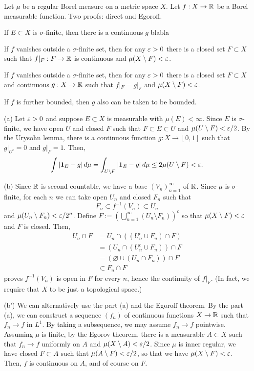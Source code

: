 \documentclass{../../large}
\begin{document}
\begin{prb}
Let $\mu$ be a regular Borel measure on a metric space $X$.
Let $f:X\to\mathbb{R}$ be a Borel measurable function.
Two proofs: direct and Egoroff.
\begin{parts}
\item If $E\subset X$ is $\sigma$-finite, then there is a continuous $g$ blabla
\item If $f$ vanishes outside a $\sigma$-finite set, then for any $\varepsilon>0$ there is a closed set $F\subset X$ such that $f|_F:F\to\mathbb{R}$ is continuous and $\mu(X\setminus F)<\varepsilon$.
\item If $f$ vanishes outside a $\sigma$-finite set, then for any $\varepsilon>0$ there is a closed set $F\subset X$ and continuous $g:X\to\mathbb{R}$ such that $f|_F=g|_F$ and $\mu(X\setminus F)<\varepsilon$.
\item If $f$ is further bounded, then $g$ also can be taken to be bounded.
\end{parts}
\end{prb}
\begin{pf}
(a)
Let $\varepsilon>0$ and suppose $E\subset X$ is measurable with $\mu(E)<\infty$.
Since $E$ is $\sigma$-finite, we have open $U$ and closed $F$ such that $F\subset E\subset U$ and $\mu(U\setminus F)<\varepsilon/2$.
By the Urysohn lemma, there is a continuous function $g:X\to[0,1]$ such that $g|_{U^c}=0$ and $g|_F=1$.
Then,
\[\int|\mathbf{1}_E-g|\,d\mu=\int_{U\setminus F}|\mathbf{1}_E-g|\,d\mu\le2\mu(U\setminus F)<\varepsilon.\]

(b)
Since $\mathbb{R}$ is second countable, we have a base $(V_n)_{n=1}^\infty$ of $\mathbb{R}$.
Since $\mu$ is $\sigma$-finite, for each $n$ we can take open $U_n$ and closed $F_n$ such that
\[F_n\subset f^{-1}(V_n)\subset U_n\]
and $\mu(U_n\setminus F_n)<\varepsilon/2^n$.
Define $F:=\left(\bigcup_{n=1}^\infty(U_n\setminus F_n)\right)^c$ so that $\mu(X\setminus F)<\varepsilon$ and $F$ is closed.
Then,
\begin{align*}
U_n\cap F
&=U_n\cap((U_n^c\cup F_n)\cap F)\\
&=(U_n\cap(U_n^c\cup F_n))\cap F\\
&=(\varnothing\cup(U_n\cap F_n))\cap F\\
&\subset F_n\cap F
\end{align*}
proves $f^{-1}(V_n)$ is open in $F$ for every $n$, hence the continuity of $f|_F$.
(In fact, we require that $X$ to be just a topological space.)

(b')
We can alternatively use the part (a) and the Egoroff theorem.
By the part (a), we can construct a sequence $(f_n)$ of continuous functions $X\to\mathbb{R}$ such that $f_n\to f$ in $L^1$.
By taking a subsequence, we may assume $f_n\to f$ pointwise.
Assuming $\mu$ is finite, by the Egorov theorem, there is a measurable $A\subset X$ such that $f_n\to f$ uniformly on $A$ and $\mu(X\setminus A)<\varepsilon/2$.
Since $\mu$ is inner regular, we have closed $F\subset A$ such that $\mu(A\setminus F)<\varepsilon/2$, so that we have $\mu(X\setminus F)<\varepsilon$.
Then, $f$ is continuous on $A$, and of course on $F$.

\end{pf}
\end{document}
